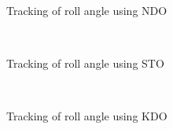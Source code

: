 \documentclass[letterpaper%
, twoside%
, 12pt%
,memoire%
, english%
,creativecommons,hyperref%
]{thETS}
\theoremstyle{newThmStyle}
\begin{document}
\begin{figure}[H]
\centering
{}
\\ \parbox{0.75\textwidth}{\caption{Tracking of roll angle using NDO}
\label{roll_trac_dis_m1_ndo}}
\end{figure}

\begin{figure}[H]
\centering
{}
\\ \parbox{0.75\textwidth}{\caption{Tracking of roll angle using STO}
\label{roll_trac_dis_m1_sto}}
\end{figure}

\begin{figure}[H]
\centering
{}
\\ \parbox{0.75\textwidth}{\caption{Tracking of roll angle using KDO}
\label{roll_trac_dis_m1_kdo}}
\end{figure}
\end{document}
